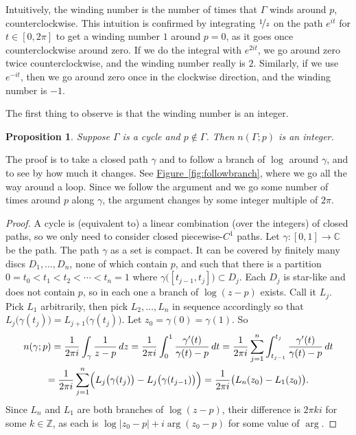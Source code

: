 \documentclass[12pt,openany]{book}
\newcommand{\sabs}[1]{\lvert {#1} \rvert}
\newcommand{\C}{{\mathbb{C}}}
\newcommand{\Z}{{\mathbb{Z}}}
\theoremstyle{plain}
\newtheorem{prop}[thm]{Proposition}
\theoremstyle{remark}
\theoremstyle{definition}
\theoremstyle{exercise}
\theoremstyle{example}
\newcommand{\figureref}[1]{\hyperref[#1]{Figure~\ref*{#1}}}
\begin{document}
Intuitively, the winding number is the number of times that $\Gamma$ winds
around $p$, counterclockwise.  This intuition is confirmed by integrating
$\nicefrac{1}{z}$ on the path $e^{it}$ for $t \in [0,2\pi]$ to get
a winding number $1$ around $p=0$,
as it goes once counterclockwise around zero.  If we do
the integral with $e^{2it}$, we go around zero twice 
counterclockwise, and the winding number really is $2$.  Similarly,
if we use $e^{-it}$, then we go around zero once in the
clockwise direction, and the winding number is $-1$.

The first thing to observe is that the winding number is an integer.

\begin{prop} \label{prop:indexinteger}
Suppose $\Gamma$ is a cycle and $p \notin \Gamma$.  Then
$n(\Gamma;p)$ is an integer.
\end{prop}

The proof is to take a closed path $\gamma$
and to follow a branch of $\log$ around $\gamma$, and
to see by how much it changes.  See \figureref{fig:followbranch}, where we
go all the way around a loop.  Since we follow the argument
and we go some number of times around $p$ along $\gamma$, the
argument changes by some integer multiple of $2\pi$.

\begin{proof}
A cycle is (equivalent to) a linear combination (over the integers) of closed paths,
so we only need to consider closed piecewise-$C^1$ paths.
Let $\gamma \colon [0,1] \to \C$ be the path.
The path $\gamma$ as a set is compact.  It can be covered by finitely many
discs $D_1,\ldots,D_n$, none of which contain $p$, and such that there is a
partition $0 = t_0 < t_1 < t_2 < \cdots < t_n = 1$ where
$\gamma\bigl([t_{j-1},t_j]\bigr) \subset D_j$.  Each $D_j$ is star-like and
does not contain $p$,
so in each one a branch of $\log (z-p)$ exists.  Call it $L_j$.
Pick $L_1$ arbitrarily, then pick $L_2,\ldots,L_n$ in sequence accordingly
so that
$L_j\bigl(\gamma(t_j)\bigr) = L_{j+1}\bigl(\gamma(t_j)\bigr)$.
Let $z_0 = \gamma(0) = \gamma(1)$.  So
\begin{multline*}
n(\gamma;p)
=
\frac{1}{2\pi i} \int_\gamma \frac{1}{z-p} \, dz
=
\frac{1}{2\pi i} \int_0^1 \frac{\gamma'(t)}{\gamma(t)-p} \, dt
=
\frac{1}{2\pi i} \sum_{j=1}^n \int_{t_{j-1}}^{t_j} \frac{\gamma'(t)}{\gamma(t)-p} \, dt
\\
=
\frac{1}{2\pi i} \sum_{j=1}^n
\Bigl(
L_j\bigl(\gamma(t_j)\bigr) -
L_j\bigl(\gamma(t_{j-1})\bigr)
\Bigr)
=
\frac{1}{2\pi i} \bigl( L_n(z_0) - L_1(z_0) \bigr) .
\end{multline*}
Since $L_n$ and $L_1$ are both branches of $\log(z-p)$, their difference is
$2\pi k i$ for some $k \in \Z$, as each is
$\log\sabs{z_0-p} + i \arg (z_0-p)$ for some value of
$\arg$.
\end{proof}
\end{document}
